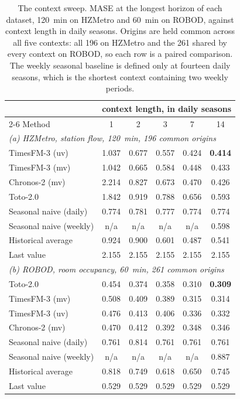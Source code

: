 \documentclass[utf8]{FrontiersinHarvard}
\newif\ifrevisionmarkup
\newcommand{\new}[1]{\ifrevisionmarkup\textcolor{revision}{#1}\else#1\fi}
\theoremstyle{plain}
\theoremstyle{definition}
\theoremstyle{remark}
\newcommand{\best}[1]{\textbf{#1}}
\begin{document}
\new{\begin{table}[htbp]
\centering
\caption{\new{The context sweep. MASE at the longest horizon of each dataset, \SI{120}{\minute} on HZMetro and \SI{60}{\minute} on ROBOD, against context length in daily seasons. Origins are held common across all five contexts: all \num{196} on HZMetro and the \num{261} shared by every context on ROBOD, so each row is a paired comparison. The weekly seasonal baseline is defined only at fourteen daily seasons, which is the shortest context containing two weekly periods.}}
\label{tab:sweep}
\small
\begin{tabular}{lccccc}
\toprule
& \multicolumn{5}{c}{context length, in daily seasons}\\
\cmidrule(lr){2-6}
Method & 1 & 2 & 3 & 7 & 14 \\
\midrule
\multicolumn{6}{l}{\emph{(a) HZMetro, station flow, \SI{120}{\minute}, \num{196} common origins}}\\
TimesFM-3 (uv)         & 1.037 & 0.677 & 0.557 & 0.424 & \best{0.414} \\
TimesFM-3 (mv)         & 1.042 & 0.665 & 0.584 & 0.448 & 0.433 \\
Chronos-2 (mv)         & 2.214 & 0.827 & 0.673 & 0.470 & 0.426 \\
Toto-2.0               & 1.842 & 0.919 & 0.788 & 0.656 & 0.593 \\
\midrule
Seasonal naive (daily) & 0.774 & 0.781 & 0.777 & 0.774 & 0.774 \\
\new{Seasonal naive (weekly)} & n/a & n/a & n/a & n/a & 0.598 \\
Historical average     & 0.924 & 0.900 & 0.601 & 0.487 & 0.541 \\
Last value             & 2.155 & 2.155 & 2.155 & 2.155 & 2.155 \\
\midrule
\multicolumn{6}{l}{\emph{(b) ROBOD, room occupancy, \SI{60}{\minute}, \num{261} common origins}}\\
Toto-2.0               & 0.454 & 0.374 & 0.358 & 0.310 & \best{0.309} \\
TimesFM-3 (mv)         & 0.508 & 0.409 & 0.389 & 0.315 & 0.314 \\
TimesFM-3 (uv)         & 0.476 & 0.413 & 0.406 & 0.336 & 0.332 \\
Chronos-2 (mv)         & 0.470 & 0.412 & 0.392 & 0.348 & 0.346 \\
\midrule
Seasonal naive (daily) & 0.761 & 0.814 & 0.761 & 0.761 & 0.761 \\
\new{Seasonal naive (weekly)} & n/a & n/a & n/a & n/a & 0.887 \\
Historical average     & 0.818 & 0.749 & 0.618 & 0.650 & 0.745 \\
Last value             & 0.529 & 0.529 & 0.529 & 0.529 & 0.529 \\
\bottomrule
\end{tabular}
\end{table}}
\end{document}
